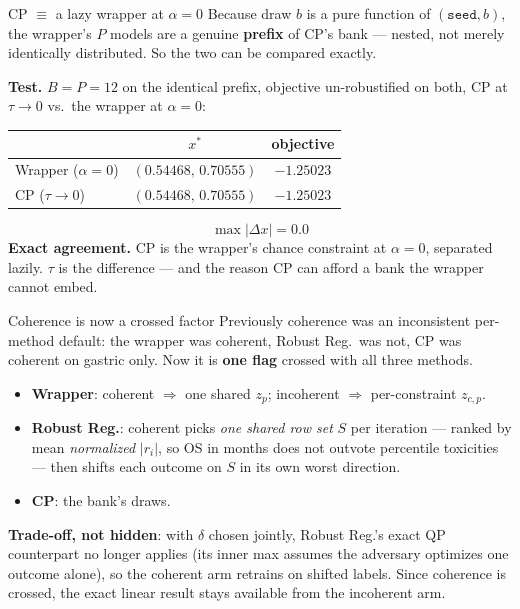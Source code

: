 \documentclass{beamer}
\begin{document}
\begin{frame}{CP $\equiv$ a lazy wrapper at $\alpha=0$}
  \small
  Because draw $b$ is a pure function of $(\texttt{seed},b)$, the wrapper's $P$
  models are a genuine \textbf{prefix} of CP's bank --- nested, not merely
  identically distributed. So the two can be compared exactly.
  \medskip

  \textbf{Test.} $B=P=12$ on the identical prefix, objective un-robustified on
  both, CP at $\tau\to0$ vs.\ the wrapper at $\alpha=0$:
  \begin{center}\small
  \begin{tabular}{@{}lcc@{}}
    \toprule
    & $x^\ast$ & objective \\
    \midrule
    Wrapper ($\alpha=0$) & $(0.54468,\,0.70555)$ & $-1.25023$ \\
    CP ($\tau\to0$)      & $(0.54468,\,0.70555)$ & $-1.25023$ \\
    \bottomrule
  \end{tabular}
  \end{center}
  \[
    \max|\Delta x| = 0.0
  \]
  \medskip
  \textbf{Exact agreement.} CP is the wrapper's chance constraint at $\alpha=0$,
  separated lazily. $\tau$ is the difference --- and the reason CP can afford a
  bank the wrapper cannot embed.
\end{frame}

\begin{frame}{Coherence is now a crossed factor}
  \small
  Previously coherence was an inconsistent per-method default: the wrapper was
  coherent, Robust Reg.\ was not, CP was coherent on gastric only. Now it is
  \textbf{one flag} crossed with all three methods.
  \begin{itemize}
    \item \textbf{Wrapper}: coherent $\Rightarrow$ one shared $z_p$; incoherent
      $\Rightarrow$ per-constraint $z_{c,p}$.
    \item \textbf{Robust Reg.}: coherent picks \emph{one shared row set} $S$ per
      iteration --- ranked by mean \emph{normalized} $|r_i|$, so OS in months does
      not outvote percentile toxicities --- then shifts each outcome on $S$ in its
      own worst direction.
    \item \textbf{CP}: the bank's draws.
  \end{itemize}
  \medskip
  \textbf{Trade-off, not hidden}: with $\delta$ chosen jointly, Robust Reg.'s exact
  QP counterpart no longer applies (its inner max assumes the adversary optimizes
  one outcome alone), so the coherent arm retrains on shifted labels. Since
  coherence is crossed, the exact linear result stays available from the
  incoherent arm.
\end{frame}
\end{document}
